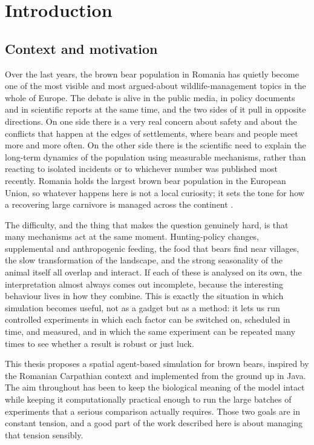 \chapter{Introduction}
\label{ch:introduction}

\section{Context and motivation}

Over the last years, the brown bear population in Romania has quietly become one of the most visible and most argued-about wildlife-management topics in the whole of Europe. The debate is alive in the public media, in policy documents and in scientific reports at the same time, and the two sides of it pull in opposite directions. On one side there is a very real concern about safety and about the conflicts that happen at the edges of settlements, where bears and people meet more and more often. On the other side there is the scientific need to explain the long-term dynamics of the population using measurable mechanisms, rather than reacting to isolated incidents or to whichever number was published most recently. Romania holds the largest brown bear population in the European Union, so whatever happens here is not a local curiosity; it sets the tone for how a recovering large carnivore is managed across the continent \cite{Chapron2014,Pop2018}.

The difficulty, and the thing that makes the question genuinely hard, is that many mechanisms act at the same moment. Hunting-policy changes, supplemental and anthropogenic feeding, the food that bears find near villages, the slow transformation of the landscape, and the strong seasonality of the animal itself all overlap and interact. If each of these is analysed on its own, the interpretation almost always comes out incomplete, because the interesting behaviour lives in how they combine. This is exactly the situation in which simulation becomes useful, not as a gadget but as a method: it lets us run controlled experiments in which each factor can be switched on, scheduled in time, and measured, and in which the same experiment can be repeated many times to see whether a result is robust or just luck.

This thesis proposes a spatial agent-based simulation for brown bears, inspired by the Romanian Carpathian context and implemented from the ground up in Java. The aim throughout has been to keep the biological meaning of the model intact while keeping it computationally practical enough to run the large batches of experiments that a serious comparison actually requires. Those two goals are in constant tension, and a good part of the work described here is about managing that tension sensibly.

